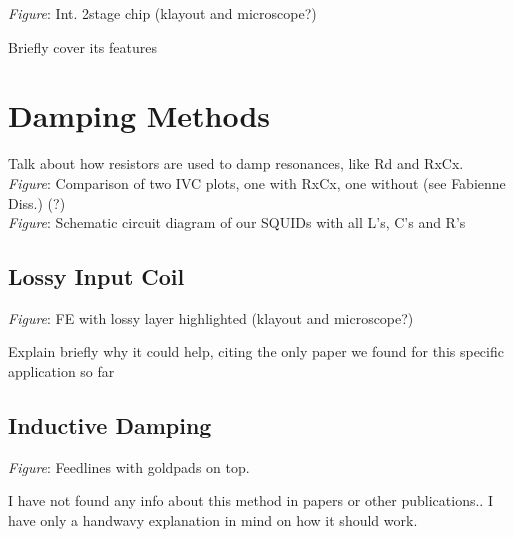 \textit{Figure}: Int. 2stage chip (klayout and microscope?)

Briefly cover its features

\section{Damping Methods} \label{sec_damping}

Talk about how resistors are used to damp resonances, like Rd and RxCx.\\ 
\textit{Figure}: Comparison of two IVC plots, one with RxCx, one without (see Fabienne Diss.) (?) \\
\textit{Figure}: Schematic circuit diagram of our SQUIDs with all L's, C's and R's

\subsection{Lossy Input Coil}

\textit{Figure}: FE with lossy layer highlighted (klayout and microscope?)

Explain briefly why it could help, citing the only paper we found for this specific application so far

\subsection{Inductive Damping}

\textit{Figure}: Feedlines with goldpads on top.

I have not found any info about this method in papers or other publications.. I have only a handwavy explanation in mind on how it should work.
